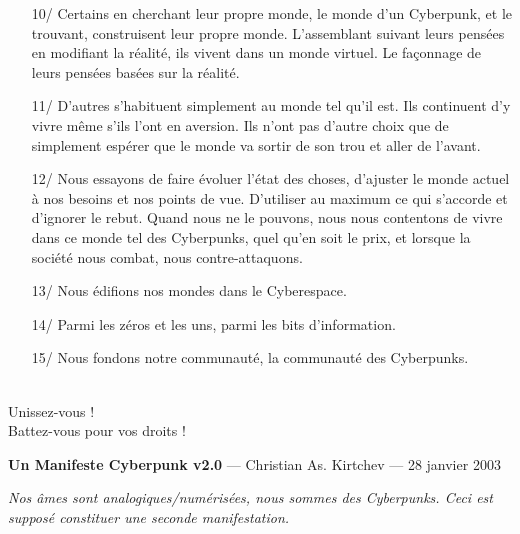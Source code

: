 \documentclass[11pt,twoside,a4paper]{book}
\begin{document}
\begin{enumerate}
\begin{enumerate}
		\item[10/] Certains en cherchant leur propre monde, le monde d'un Cyberpunk, et le trouvant, construisent leur propre monde. L'assemblant suivant leurs pens{\'e}es en modifiant la r{\'e}alit{\'e}, ils vivent dans un monde virtuel. Le fa\c{c}onnage de leurs pens{\'e}es bas{\'e}es sur la r{\'e}alit{\'e}.
		\item[11/] D'autres s'habituent simplement au monde tel qu'il est. Ils continuent d'y vivre m{\^e}me s'ils l'ont en aversion. Ils n'ont pas d'autre choix que de simplement esp{\'e}rer que le monde va sortir de son trou et aller de l'avant.
		\item[12/] Nous essayons de faire {\'e}voluer l'{\'e}tat des choses, d'ajuster le monde actuel {\`a} nos besoins et nos points de vue. D'utiliser au maximum ce qui s'accorde et d'ignorer le rebut. Quand nous ne le pouvons, nous nous contentons de vivre dans ce monde tel des Cyberpunks, quel qu'en soit le prix, et lorsque la soci{\'e}t{\'e} nous combat, nous contre-attaquons.
		\item[13/] Nous {\'e}difions nos mondes dans le Cyberespace.
		\item[14/] Parmi les z{\'e}ros et les uns, parmi les bits d'information.
		\item[15/] Nous fondons notre communaut{\'e}, la communaut{\'e} des Cyberpunks.
	\end{enumerate}
\end{enumerate} ~\\

Unissez-vous ! ~\\

Battez-vous pour vos droits ! ~\\


\clearpage

\textbf{\Large Un Manifeste Cyberpunk v2.0} --- Christian As. Kirtchev --- 28 janvier 2003

\emph{\footnotesize Nos {\^a}mes sont analogiques/num{\'e}ris{\'e}es, nous sommes des Cyberpunks. Ceci est suppos{\'e} constituer une seconde manifestation. } %
\end{document}

